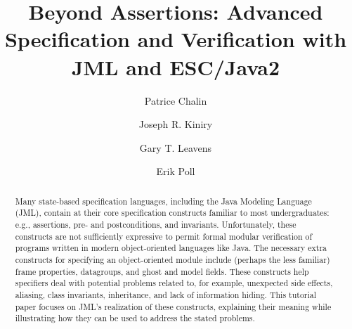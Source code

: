 \documentclass{llncs}
\begin{document}
\title{Beyond Assertions: 
       Advanced Specification and Verification with JML and ESC/Java2}

\author{Patrice Chalin
        \and Joseph R. Kiniry
        \and Gary T. Leavens 
        \and Erik Poll
       }




\newcommand{\MARGIN}[1]{}
\newcommand{\COMMENT}[1]{}
\newcommand{\GMARGIN}[1]{\MARGIN{\textcolor{blue}{\sf\scriptsize #1}}}

\newcommand{\figref}[1]{\figurename~\ref{#1}}
\newcommand{\secref}[1]{Section~\ref{#1}}

\newcommand{\extracite}[1]{} %

\newcommand{\todo}{\textbf{TODO:}}
\newcommand{\eg}{e.g.,\xspace}
\newcommand{\ie}{i.e.,\xspace}
\newcommand{\etc}{etc.\xspace}

\maketitle

\begin{abstract}
Many state-based specification languages, including the Java Modeling Language
(JML), contain at their core specification constructs familiar to most
undergraduates: e.g., assertions,
pre- and postconditions, and invariants.  Unfortunately, these constructs are
not sufficiently expressive to permit formal modular verification of programs
written in modern object-oriented languages like Java. The necessary extra
constructs for specifying an object-oriented module include (perhaps the less familiar)
frame properties, datagroups, and ghost and model fields.  These constructs
help specifiers deal with potential problems related to, for example, unexpected side
effects, aliasing, class invariants, inheritance, and lack of information
hiding.
%
This tutorial paper focuses on JML's realization of
these constructs, explaining their meaning while
illustrating how they can be used to address the stated problems.
\end{abstract}
\end{document}
